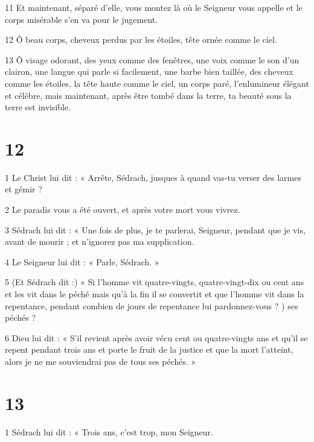 \par 11 Et maintenant, séparé d'elle, vous montez là où le Seigneur vous appelle et le corps misérable s'en va pour le jugement.

\par 12 Ô beau corps, cheveux perdus par les étoiles, tête ornée comme le ciel.

\par 13 Ô visage odorant, des yeux comme des fenêtres, une voix comme le son d'un clairon, une langue qui parle si facilement, une barbe bien taillée, des cheveux comme les étoiles, la tête haute comme le ciel, un corps paré, l'enlumineur élégant et célèbre, mais maintenant, après être tombé dans la terre, ta beauté sous la terre est invisible.

\chapter{12}

\par 1 Le Christ lui dit : « Arrête, Sédrach, jusques à quand vas-tu verser des larmes et gémir ?   

\par 2 Le paradis vous a été ouvert, et après votre mort vous vivrez.

\par 3 Sédrach lui dit : « Une fois de plus, je te parlerai, Seigneur, pendant que je vis, avant de mourir ; et n’ignorez pas ma supplication.

\par 4 Le Seigneur lui dit : « Parle, Sédrach. »

\par 5 (Et Sédrach dit :) « Si l'homme vit quatre-vingts, quatre-vingt-dix ou cent ans et les vit dans le péché mais qu'à la fin il se convertit et que l'homme vit dans la repentance, pendant combien de jours de repentance lui pardonnez-vous ? ) ses péchés ?

\par 6 Dieu lui dit : « S'il revient après avoir vécu cent ou quatre-vingts ans et qu'il se repent pendant trois ans et porte le fruit de la justice et que la mort l'atteint, alors je ne me souviendrai pas de tous ses péchés. »

\chapter{13}

\par 1 Sédrach lui dit : « Trois ans, c'est trop, mon Seigneur.

